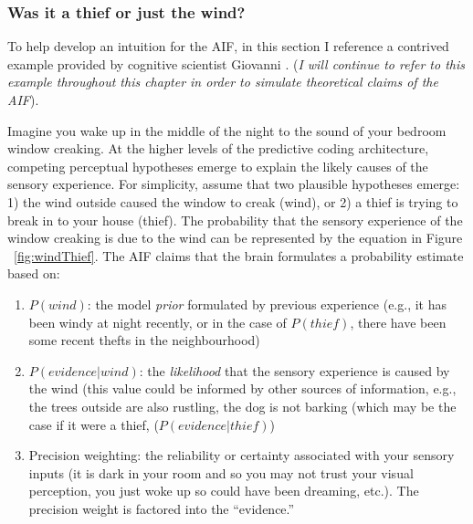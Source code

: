 \begin{CJK}{UTF8}{gbsn}





\subsubsection{Was it a thief or just the wind?\label{sect:windThief}}
To help develop an intuition for the AIF, in this section I reference a contrived example provided by cognitive scientist Giovanni \textcite{Pezzulo2014}.  (\textit{I will continue to refer to this example throughout this chapter in order to simulate theoretical claims of the AIF}).

Imagine you wake up in the middle of the night to the sound of your bedroom window creaking.  At the higher levels of the predictive coding architecture, competing perceptual hypotheses emerge to explain the likely causes of the sensory experience.  For simplicity, assume that two plausible hypotheses emerge: 1) the wind outside caused the window to creak (wind), or 2) a thief is trying to break in to your house (thief).  The probability that the sensory experience of the window creaking is due to the wind can be represented by the equation in Figure ~\ref{fig:windThief}. The AIF claims that the brain formulates a probability estimate based on:

\begin{enumerate}
\item $P(wind)$: the model \textit{prior} formulated by previous experience (e.g., it has been windy at night recently, or in the case of $P(thief)$, there have been some recent thefts in the neighbourhood)
\item $P(evidence|wind)$: the \textit{likelihood} that the sensory experience is caused by the wind (this value could be informed by other sources of information, e.g., the trees outside are also rustling, the dog is not barking (which may be the case if it were a thief, ($P(evidence|thief)$)
\item Precision weighting: the reliability or certainty associated with your sensory inputs (it is dark in your room and so you may not trust your visual perception, you just woke up so could have been dreaming, etc.).  The precision weight is factored into the ``evidence.''
\end{enumerate}


\end{CJK}
